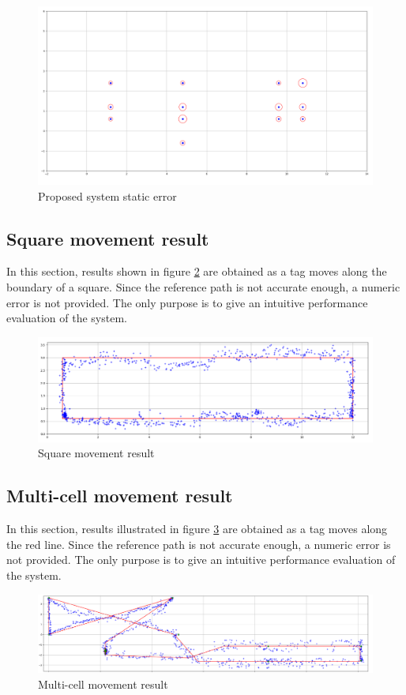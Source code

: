 \documentclass[\main/main.tex]{subfiles}
\begin{document}
\begin{figure}[H]     
    \centering
    \includegraphics[width=1\textwidth]{result_static.png}
    \caption{Proposed system static error}
    \label{fig:proposed_rms_error}
\end{figure}

\subsection{Square movement result}
In this section, results shown in figure \ref{fig:result_square} are obtained as a tag moves along the boundary of a square. Since the reference path is not accurate enough, a numeric error is not provided. The only purpose is to give an intuitive performance evaluation of the system.
\begin{figure}[H]
    \centering
    \includegraphics[width=1\textwidth]{result_square.png}
    \caption{Square movement result}
    \label{fig:result_square}
\end{figure}

\subsection{Multi-cell movement result}
In this section, results illustrated in figure \ref{fig:multi_cell_movement_result} are obtained as a tag moves along the red line. Since the reference path is not accurate enough, a numeric error is not provided. The only purpose is to give an intuitive performance evaluation of the system.
\begin{figure}[H]
    \centering
    \includegraphics[width=1\textwidth]{path.png}
    \caption{Multi-cell movement result}
    \label{fig:multi_cell_movement_result}
\end{figure}
\end{document}
